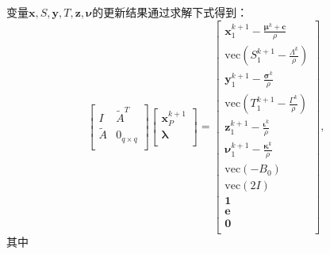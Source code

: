 变量$\mathbf{x},S,\mathbf{y},T,\mathbf{z},\mathbf{\nu }$的更新结果通过求解下式得到：
\begin{equation}
    \label{tab:equ-3-48}
    \left[ \begin{matrix}
        I&		\tilde{A}^T\\
        \tilde{A}&		0_{q\times q}\\
    \end{matrix} \right] \left[ \begin{array}{c}
        \mathbf{x}_{P}^{k+1}\\
        \boldsymbol{\lambda }\\
    \end{array} \right] =\left[ \begin{array}{c}
        \mathbf{x}_{1}^{k+1}-\frac{\boldsymbol{\mu }^k+\boldsymbol{c}}{\rho}\\
        \mathrm{vec}\left( S_{1}^{k+1}-\frac{\Lambda ^k}{\rho} \right)\\
        \mathbf{y}_{1}^{k+1}-\frac{\boldsymbol{\sigma }^k}{\rho}\\
        \mathrm{vec}\left( T_{1}^{k+1}-\frac{\varGamma ^k}{\rho} \right)\\
        \mathbf{z}_{1}^{k+1}-\frac{\boldsymbol{\iota }^k}{\rho}\\
        \mathbf{\nu }_{1}^{k+1}-\frac{\boldsymbol{\kappa }^k}{\rho}\\
        \mathrm{vec}\left( -B_0 \right)\\
        \mathrm{vec}\left( 2I \right)\\
        \mathbf{1}\\
        \boldsymbol{e}\\
        \mathbf{0}\\
    \end{array} \right] , 
\end{equation}
其中
